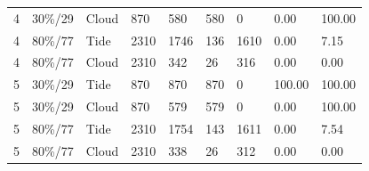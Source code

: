 \begin{table}[!htbp]
{\begin{tabular}{lllllllll}
4 & 30\%/29 & Cloud & 870 & 580 & 580 & 0 & 0.00 & 100.00 \\
4 & 80\%/77 & Tide & 2310 & 1746 & 136 & 1610 & 0.00 & 7.15 \\
4 & 80\%/77 & Cloud & 2310 & 342 & 26 & 316 & 0.00 & 0.00 \\
5 & 30\%/29 & Tide & 870 & 870 & 870 & 0 & 100.00 & 100.00 \\
5 & 30\%/29 & Cloud & 870 & 579 & 579 & 0 & 0.00 & 100.00 \\
5 & 80\%/77 & Tide & 2310 & 1754 & 143 & 1611 & 0.00 & 7.54 \\
5 & 80\%/77 & Cloud & 2310 & 338 & 26 & 312 & 0.00 & 0.00 \\
\bottomrule
\end{tabular}}
\end{table}

